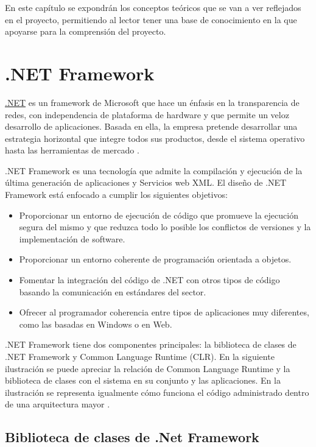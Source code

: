 
En este capítulo se expondrán los conceptos teóricos que se van a ver reflejados en el proyecto, permitiendo al lector tener una base de conocimiento en la que apoyarse para la comprensión del proyecto.

\section{.NET Framework}

\href{https://dotnet.microsoft.com/}{.NET} es un framework de Microsoft que hace un énfasis en la transparencia de redes, con independencia de plataforma de hardware y que permite un veloz desarrollo de aplicaciones. Basada en ella, la empresa pretende desarrollar una estrategia horizontal que integre todos sus productos, desde el sistema operativo hasta las herramientas de mercado \cite{wiki:dotNet}.

.NET Framework es una tecnología que admite la compilación y ejecución de la última generación de aplicaciones y Servicios web XML. El diseño de .NET Framework está enfocado a cumplir los siguientes objetivos:
\begin{itemize}
	\item Proporcionar un entorno de ejecución de código que promueve la ejecución segura del mismo y que reduzca todo lo posible los conflictos de versiones y la implementación de software.
	\item Proporcionar un entorno coherente de programación orientada a objetos.
	\item Fomentar la integración del código de .NET con otros tipos de código basando la comunicación en estándares del sector.
	\item Ofrecer al programador coherencia entre tipos de aplicaciones muy diferentes, como las basadas en Windows o en Web.
\end{itemize}

.NET Framework tiene dos componentes principales: la biblioteca de clases de .NET Framework y Common Language Runtime (CLR). En la siguiente ilustración se puede apreciar la relación de Common Language Runtime y la biblioteca de clases con el sistema en su conjunto y las aplicaciones. En la ilustración se representa igualmente cómo funciona el código administrado dentro de una arquitectura mayor \cite{web:docNet}.


\subsection{Biblioteca de clases de .Net Framework}

